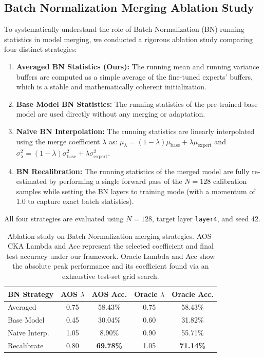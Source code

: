 \documentclass{article}
\theoremstyle{plain}
\theoremstyle{definition}
\theoremstyle{remark}
\begin{document}
\subsection{Batch Normalization Merging Ablation Study}
To systematically understand the role of Batch Normalization (BN) running statistics in model merging, we conducted a rigorous ablation study comparing four distinct strategies:
\begin{enumerate}
    \item \textbf{Averaged BN Statistics (Ours):} The running mean and running variance buffers are computed as a simple average of the fine-tuned experts' buffers, which is a stable and mathematically coherent initialization.
    \item \textbf{Base Model BN Statistics:} The running statistics of the pre-trained base model are used directly without any merging or adaptation.
    \item \textbf{Naive BN Interpolation:} The running statistics are linearly interpolated using the merge coefficient $\lambda$ as: $\mu_{\lambda} = (1-\lambda)\mu_{\text{base}} + \lambda \mu_{\text{expert}}$ and $\sigma^2_{\lambda} = (1-\lambda)\sigma^2_{\text{base}} + \lambda \sigma^2_{\text{expert}}$.
    \item \textbf{BN Recalibration:} The running statistics of the merged model are fully re-estimated by performing a single forward pass of the $N=128$ calibration samples while setting the BN layers to training mode (with a momentum of 1.0 to capture exact batch statistics).
\end{enumerate}
All four strategies are evaluated using $N=128$, target layer \texttt{layer4}, and seed 42.

\begin{table}[h]
\caption{Ablation study on Batch Normalization merging strategies. AOS-CKA Lambda and Acc represent the selected coefficient and final test accuracy under our framework. Oracle Lambda and Acc show the absolute peak performance and its coefficient found via an exhaustive test-set grid search.}
\label{table:bn_ablation}
\vskip 0.15in
\begin{center}
\begin{small}
\begin{sc}
\setlength{\tabcolsep}{1.5pt}
\begin{tabular}{lcccc}
\toprule
\textbf{BN Strategy} & \textbf{AOS $\lambda$} & \textbf{AOS Acc.} & \textbf{Oracle $\lambda$} & \textbf{Oracle Acc.} \\
\midrule
Averaged & 0.75 & 58.43\% & 0.75 & 58.43\% \\
Base Model & 0.45 & 30.04\% & 0.60 & 31.82\% \\
Naive Interp. & 1.05 & 8.90\% & 0.90 & 55.71\% \\
Recalibrate & 0.80 & \textbf{69.78\%} & 1.05 & \textbf{71.14\%} \\
\bottomrule
\end{tabular}
\end{sc}
\end{small}
\end{center}
\vskip -0.1in
\end{table}
\end{document}
